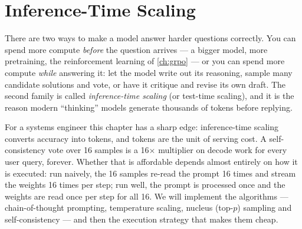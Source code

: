 \chapter{Inference-Time Scaling}\label{ch:scaling}


There are two ways to make a model answer harder questions correctly. You can spend more compute
\emph{before} the question arrives --- a bigger model, more pretraining, the reinforcement
learning of \cref{ch:grpo} --- or you can spend more compute \emph{while} answering it: let the
model write out its reasoning, sample many candidate solutions and vote, or have it critique and
revise its own draft. The second family is called \emph{inference-time scaling} (or test-time
scaling), and it is the reason modern ``thinking'' models generate thousands of tokens before
replying.

For a systems engineer this chapter has a sharp edge: inference-time scaling converts accuracy
into tokens, and tokens are the unit of serving cost. A self-consistency vote over 16 samples is a
16$\times$ multiplier on decode work for every user query, forever. Whether that is affordable
depends almost entirely on how it is executed: run naively, the 16 samples re-read the prompt 16
times and stream the weights 16 times per step; run well, the prompt is processed once and the
weights are read once per step for all 16. We will implement the algorithms --- chain-of-thought
prompting, temperature scaling, nucleus (top-$p$) sampling and self-consistency --- and then the
execution strategy that makes them cheap.

